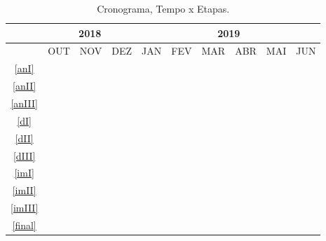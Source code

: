 \documentclass[
	12pt,				%
	openright,			%
	oneside,            %
	a4paper,			%
	chapter=TITLE,		%
	section=TITLE,		%
	subsection=TITLE,	%
	subsubsection=TITLE,%
	english,			%
	brazil,				%
]{abntex2}
\begin{document}
\begin{table}[!htbp]
\ABNTEXfontereduzida
\caption{Cronograma, Tempo x Etapas.}
	\centering
	\begin{tabular}{|c|c|c|c|c|c|c|c|c|c|}
		\hline
		&\multicolumn{3}{c|}{2018}&\multicolumn{6}{c|}{2019}\\
		\hline
		&OUT&NOV&DEZ&JAN&FEV&MAR&ABR&MAI&JUN\\
		\hline
		\ref{anI}&\cellcolor{midgray}&&&&&&&&\\
		\hline
		\ref{anII}&\cellcolor{midgray}&&&&&&&&\\
		\hline
		\ref{anIII}&&\cellcolor{midgray}&&&&&&&\\
		\hline
		\ref{dI}&&&\cellcolor{midgray}&&&&&&\\
		\hline
		\ref{dII}&&&&\cellcolor{midgray}&&&&&\\
		\hline
		\ref{dIII}&&&&&\cellcolor{midgray}&&&&\\
		\hline
		\ref{imI}&&&&&&\cellcolor{midgray}&&&\\
		\hline
		\ref{imII}&&&&&&&\cellcolor{midgray}&&\\
		\hline
		\ref{imIII}&&&&&&&\cellcolor{midgray}&&\\
		\hline
		\ref{final}&&&&&&&&\cellcolor{midgray}&\cellcolor{midgray}\\
		\hline
	\end{tabular}
\end{table}



\postextual





\printindex
\end{document}

